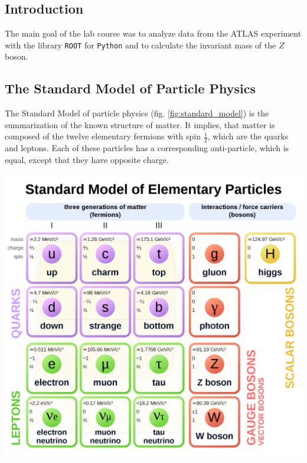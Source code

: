 \documentclass[12pt, a4paper, bibliography=totoc]{scrartcl}
\begin{document}
\begin{multicols}{2}
\section{Introduction}

The main goal of the lab course was to analyze data from the ATLAS experiment with the library \verb*+ROOT+ for \verb*+Python+ and to calculate the invariant mass of the $Z$ boson. 

\subsection{The Standard Model of Particle Physics}

The Standard Model of particle physics (fig. \ref{fig:standard_model}) is the summarization of the known structure of matter.
It implies, that matter is composed of the twelve elementary fermions with spin $\frac{1}{2}$, which are the quarks and leptons. 
Each of these particles has a corresponding anti-particle, which is equal, except that they have opposite charge.

    \begin{center}
\label{fig:standard_model}
    \includegraphics[width=0.8\linewidth]{fig/standard_model.png}
    \end{center}


\end{multicols}
\end{document}
